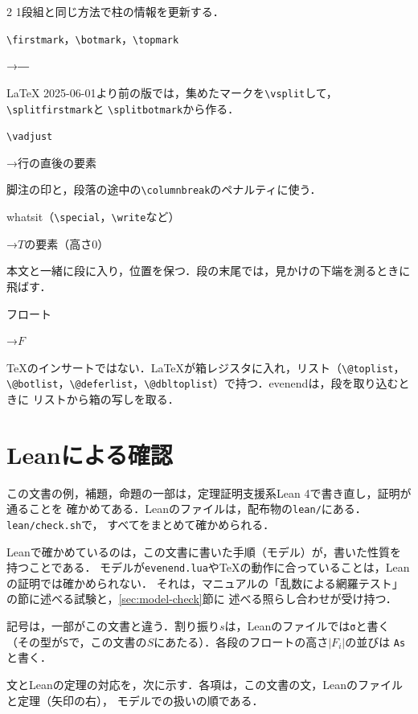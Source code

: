 \documentclass[paper=a4,fontsize=10pt]{jlreq}
\newcommand\cs[1]{\texttt{\textbackslash #1}}
\newcommand\taiou[2]{\par\addvspace{.3\baselineskip}\noindent
  {\raggedright\gtfamily\sffamily\noindent #1\par}\nobreak
  {\raggedright\hangindent=3\zw\hangafter=1\noindent\hspace{1\zw}→\hspace{1\zw}#2\par}\nobreak\noindent\ignorespaces}
\begin{document}
\begin{evenendmulticols}[columnsep=26pt]{2}
  1段組と同じ方法で柱の情報を更新する．
\taiou{\cs{firstmark}，\cs{botmark}，\cs{topmark}}{―}
  \LaTeX{} 2025-06-01より前の版では，集めたマークを\cs{vsplit}して，\cs{splitfirstmark}と
  \cs{splitbotmark}から作る．
\taiou{\cs{vadjust}}{行の直後の要素}
  脚注の印と，段落の途中の\cs{columnbreak}のペナルティに使う．
\taiou{whatsit（\cs{special}，\cs{write}など）}{$T$の要素（高さ0）}
  本文と一緒に段に入り，位置を保つ．段の末尾では，見かけの下端を測るときに飛ばす．
\taiou{フロート}{$F$}
  \TeX{}のインサートではない．\LaTeX{}が箱レジスタに入れ，リスト（\cs{@toplist}，
  \cs{@botlist}，\cs{@deferlist}，\cs{@dbltoplist}）で持つ．evenendは，段を取り込むときに
  リストから箱の写しを取る．
\end{evenendmulticols}

\section{Leanによる確認}\label{sec:lean}

この文書の例，補題，命題の一部は，定理証明支援系Lean 4で書き直し，証明が通ることを
確かめてある．Leanのファイルは，配布物の\texttt{lean/}にある．\texttt{lean/check.sh}で，
すべてをまとめて確かめられる．

Leanで確かめているのは，この文書に書いた手順（モデル）が，書いた性質を持つことである．
モデルが\texttt{evenend.lua}や\TeX{}の動作に合っていることは，Leanの証明では確かめられない．
それは，マニュアルの「乱数による網羅テスト」の節に述べる試験と，\ref{sec:model-check}節に
述べる照らし合わせが受け持つ．

記号は，一部がこの文書と違う．割り振り$s$は，Leanのファイルでは\texttt{σ}と書く
（その型が\texttt{S}で，この文書の$S$にあたる）．各段のフロートの高さ$|F_i|$の並びは
\texttt{As}と書く．

文とLeanの定理の対応を，次に示す．各項は，この文書の文，Leanのファイルと定理（矢印の右），
モデルでの扱いの順である．
\end{document}
